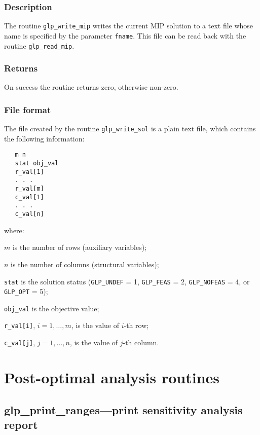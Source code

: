\subsubsection*{Description}

The routine \verb|glp_write_mip| writes the current MIP solution to a
text file whose name is specified by the parameter \verb|fname|. This
file can be read back with the routine \verb|glp_read_mip|.

\subsubsection*{Returns}

On success the routine returns zero, otherwise non-zero.

\subsubsection*{File format}

The file created by the routine \verb|glp_write_sol| is a plain text
file, which contains the following information:

\begin{verbatim}
   m n
   stat obj_val
   r_val[1]
   . . .
   r_val[m]
   c_val[1]
   . . .
   c_val[n]
\end{verbatim}

\noindent
where:

\noindent
$m$ is the number of rows (auxiliary variables);

\noindent
$n$ is the number of columns (structural variables);

\noindent
\verb|stat| is the solution status (\verb|GLP_UNDEF| = 1,
\verb|GLP_FEAS| = 2, \verb|GLP_NOFEAS| = 4, or \verb|GLP_OPT| = 5);

\noindent
\verb|obj_val| is the objective value;

\noindent
\verb|r_val[i]|, $i=1,\dots,m$, is the value of $i$-th row;

\noindent
\verb|c_val[j]|, $j=1,\dots,n$, is the value of $j$-th column.


\newpage

\section{Post-optimal analysis routines}

\subsection{glp\_print\_ranges---print sensitivity analysis report}


